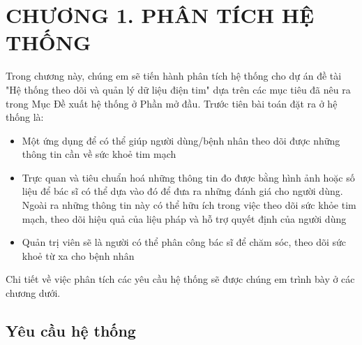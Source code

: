 
\section*{CHƯƠNG 1. PHÂN TÍCH HỆ THỐNG}
\setcounter{section}{1}
\setcounter{subsection}{0} %
\setcounter{table}{0} %
\setcounter{figure}{0} %
Trong chương này, chúng em sẽ tiến hành phân tích hệ thống cho dự án đề tài "Hệ thống theo dõi và quản lý dữ liệu điện tim" dựa trên các mục tiêu
đã nêu ra trong Mục Đề xuất hệ thống ở Phần mở đầu. Trước tiên bài toán đặt ra ở hệ thống là:
\begin{adjustwidth}{1.5em}{}
\begin{itemize}
  \item Một ứng dụng để có thể giúp người dùng/bệnh nhân theo dõi được những thông tin cần về sức khoẻ tim mạch
  \item Trực quan và tiêu chuẩn hoá những thông tin đo được
    bằng hình ảnh hoặc số liệu để bác sĩ có thể dựa vào đó để đưa ra những đánh giá cho người dùng. Ngoài ra những thông tin này
    có thể hữu ích trong việc theo dõi sức khỏe tim mạch, theo dõi hiệu quả của liệu pháp 
    và hỗ trợ quyết định của người dùng
  \item Quản trị viên sẽ là người có thể phân công bác sĩ để chăm sóc, theo dõi sức khoẻ từ
  xa cho bệnh nhân
\end{itemize}
\end{adjustwidth}
Chi tiết về việc phân tích các yêu cầu hệ thống sẽ được chúng em trình bày ở các chương dưới.

\subsection{Yêu cầu hệ thống}
